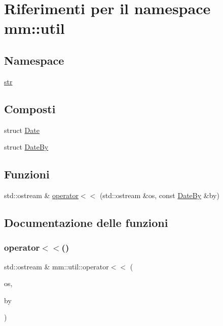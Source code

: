 \hypertarget{namespacemm_1_1util}{}\section{Riferimenti per il namespace mm\+:\+:util}
\label{namespacemm_1_1util}
\subsection*{Namespace}
\begin{DoxyCompactItemize}
\item 
 \hyperlink{namespacemm_1_1util_1_1str}{str}
\end{DoxyCompactItemize}
\subsection*{Composti}
\begin{DoxyCompactItemize}
\item 
struct \hyperlink{structmm_1_1util_1_1_date}{Date}
\item 
struct \hyperlink{structmm_1_1util_1_1_date_by}{Date\+By}
\end{DoxyCompactItemize}
\subsection*{Funzioni}
\begin{DoxyCompactItemize}
\item 
std\+::ostream \& \hyperlink{namespacemm_1_1util_a86bb3df244e56f6252ddc9d9be2c1b8a}{operator$<$$<$} (std\+::ostream \&os, const \hyperlink{structmm_1_1util_1_1_date_by}{Date\+By} \&by)
\end{DoxyCompactItemize}


\subsection{Documentazione delle funzioni}
\mbox{\label{namespacemm_1_1util_a86bb3df244e56f6252ddc9d9be2c1b8a}} 
\subsubsection{\texorpdfstring{operator$<$$<$()}{operator<<()}}
{\footnotesize\ttfamily std\+::ostream \& mm\+::util\+::operator$<$$<$ (\begin{DoxyParamCaption}\item[{std\+::ostream \&}]{os,  }\item[{const \hyperlink{structmm_1_1util_1_1_date_by}{Date\+By} \&}]{by }\end{DoxyParamCaption})}

